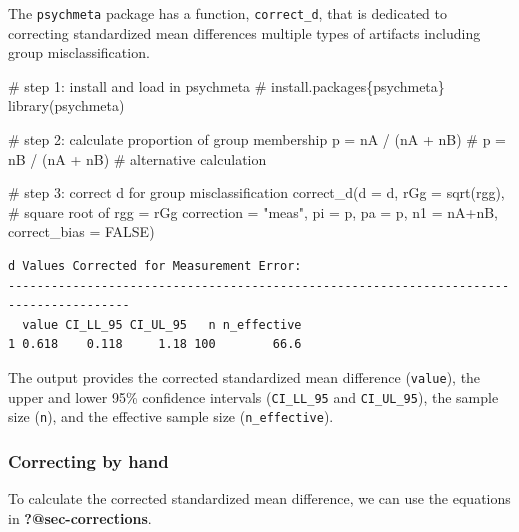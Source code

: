 \documentclass[
  letterpaper,
  DIV=11,
  numbers=noendperiod]{scrreprt}
\newenvironment{Shaded}{\begin{snugshade}}{\end{snugshade}}
\newcommand{\AttributeTok}[1]{\textcolor[rgb]{0.40,0.45,0.13}{#1}}
\newcommand{\CommentTok}[1]{\textcolor[rgb]{0.37,0.37,0.37}{#1}}
\newcommand{\ConstantTok}[1]{\textcolor[rgb]{0.56,0.35,0.01}{#1}}
\newcommand{\FunctionTok}[1]{\textcolor[rgb]{0.28,0.35,0.67}{#1}}
\newcommand{\NormalTok}[1]{\textcolor[rgb]{0.00,0.23,0.31}{#1}}
\newcommand{\OtherTok}[1]{\textcolor[rgb]{0.00,0.23,0.31}{#1}}
\newcommand{\SpecialCharTok}[1]{\textcolor[rgb]{0.37,0.37,0.37}{#1}}
\newcommand{\StringTok}[1]{\textcolor[rgb]{0.13,0.47,0.30}{#1}}
\begin{document}
The \texttt{psychmeta} package has a function, \texttt{correct\_d}, that
is dedicated to correcting standardized mean differences multiple types
of artifacts including group misclassification.

\begin{Shaded}
\begin{Highlighting}[]
\CommentTok{\# step 1: install and load in psychmeta}
\CommentTok{\# install.packages\{\textquotesingle{}psychmeta\textquotesingle{}\}}
\FunctionTok{library}\NormalTok{(psychmeta)}

\CommentTok{\# step 2: calculate proportion of group membership}
\NormalTok{p }\OtherTok{=}\NormalTok{ nA }\SpecialCharTok{/}\NormalTok{ (nA }\SpecialCharTok{+}\NormalTok{ nB)}
\CommentTok{\# p = nB / (nA + nB) \# alternative calculation}

\CommentTok{\# step 3: correct d for group misclassification}
\FunctionTok{correct\_d}\NormalTok{(}\AttributeTok{d =}\NormalTok{ d,}
          \AttributeTok{rGg =} \FunctionTok{sqrt}\NormalTok{(rgg), }\CommentTok{\# square root of rgg = rGg}
          \AttributeTok{correction =} \StringTok{"meas"}\NormalTok{,}
          \AttributeTok{pi =}\NormalTok{ p,}
          \AttributeTok{pa =}\NormalTok{ p,}
          \AttributeTok{n1 =}\NormalTok{ nA}\SpecialCharTok{+}\NormalTok{nB,}
          \AttributeTok{correct\_bias =} \ConstantTok{FALSE}\NormalTok{)}
\end{Highlighting}
\end{Shaded}

\begin{verbatim}
d Values Corrected for Measurement Error:
---------------------------------------------------------------------------------------
  value CI_LL_95 CI_UL_95   n n_effective
1 0.618    0.118     1.18 100        66.6
\end{verbatim}

The output provides the corrected standardized mean difference
(\texttt{value}), the upper and lower 95\% confidence intervals
(\texttt{CI\_LL\_95} and \texttt{CI\_UL\_95}), the sample size
(\texttt{n}), and the effective sample size (\texttt{n\_effective}).

\hypertarget{correcting-by-hand}{%
\subsubsection*{Correcting by hand}\label{correcting-by-hand}}

To calculate the corrected standardized mean difference, we can use the
equations in \textbf{?@sec-corrections}.
\end{document}
